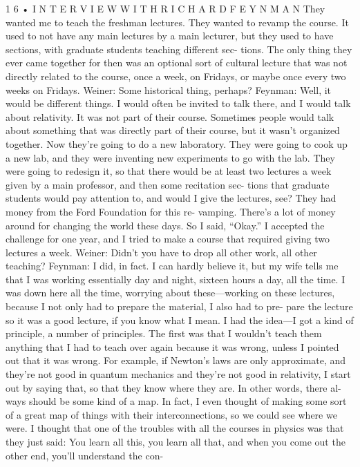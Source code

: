 \documentclass[11pt,oneside]{article}
\begin{document}
1 6 • I N T E R V I E W  W I T H  R I C H A R D  F E Y N M A N They wanted me to teach the freshman lectures. They wanted to revamp the course. It used to not have any main lectures by a main lecturer, but they used to have sections, with graduate students teaching different sec- tions. The only thing they ever came together for then was an optional sort of cultural lecture that was not directly related to the course, once a week, on Fridays, or maybe once every two weeks on Fridays. Weiner: Some historical thing, perhaps? Feynman: Well, it would be different things. I would often be invited to talk there, and I would talk about relativity. It was not part of their course. Sometimes people would talk about something that was directly part of their course, but it wasn’t organized together. Now they’re going to do a new laboratory. They were going to cook up a new lab, and they were inventing new experiments to go with the lab. They were going to redesign it, so that there would be at least two lectures a week given by a main professor, and then some recitation sec- tions that graduate students would pay attention to, and would I give the lectures, see? They had money from the Ford Foundation for this re- vamping. There’s a lot of money around for changing the world these days. So I said, “Okay.” I accepted the challenge for one year, and I tried to make a course that required giving two lectures a week. Weiner: Didn’t you have to drop all other work, all other teaching? Feynman: I did, in fact. I can hardly believe it, but my wife tells me that I was working essentially day and night, sixteen hours a day, all the time. I was down here all the time, worrying about these---working on these lectures, because I not only had to prepare the material, I also had to pre- pare the lecture so it was a good lecture, if you know what I mean. I had the idea---I got a kind of principle, a number of principles. The first was that I wouldn’t teach them anything that I had to teach over again because it was wrong, unless I pointed out that it was wrong. For example, if Newton’s laws are only approximate, and they’re not good in quantum mechanics and they’re not good in relativity, I start out by saying that, so that they know where they are. In other words, there al- ways should be some kind of a map. In fact, I even thought of making some sort of a great map of things with their interconnections, so we could see where we were. I thought that one of the troubles with all the courses in physics was that they just said: You learn all this, you learn all that, and when you come out the other end, you’ll understand the con-\par
\end{document}
